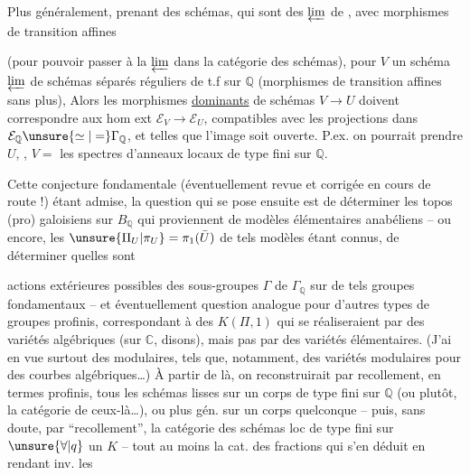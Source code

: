 Plus généralement, prenant  des schémas,  qui sont des $\varprojlim$ de   , avec morphismes de transition  affines

(pour pouvoir passer à la $\varprojlim$ dans la catégorie des schémas), pour $V$ un schéma $\varprojlim$ de schémas séparés réguliers de t.f sur $\mathbb{Q}$ (morphismes de transition  affines sans plus), Alors les morphismes \uline{dominants} de schémas $V\longrightarrow U$ doivent correspondre aux hom ext $\mathcal{E}_V\longrightarrow\mathcal{E}_U$, compatibles avec les projections dans $\mathcal{E}_{\mathbb{Q}}\unsure{\simeq|=}\Gamma_{\mathbb{Q}}$, et telles que l'image soit ouverte. P.ex. on pourrait prendre  $U$, , $V=$ les spectres d'anneaux locaux  de type fini sur $\mathbb{Q}$.


Cette conjecture fondamentale (éventuellement revue et corrigée en cours de route !) étant admise, la question qui se pose ensuite est de déterminer les topos (pro) galoisiens sur $B_{\mathbb{Q}}$ qui proviennent de modèles élémentaires anabéliens -- ou encore, les $\unsure{\Pi_U|\pi_U}=\pi_1(\bar U)$ de tels modèles étant connus, de déterminer quelles sont

actions extérieures possibles des sous-groupes $\Gamma$ de $\Gamma_{\mathbb{Q}}$ sur de tels groupes fondamentaux -- et éventuellement question analogue pour d'autres types de groupes profinis, correspondant à des $K(\Pi,1)$ qui se réaliseraient par des variétés algébriques (sur $\mathbb{C}$, disons), mais pas par des variétés élémentaires. (J'ai en vue surtout des   modulaires, tels que, notamment, des variétés modulaires pour des courbes algébriques\ldots) À partir de là, on reconstruirait par recollement, en termes profinis, tous les schémas lisses sur un corps de type fini sur $\mathbb{Q}$ (ou plutôt, la catégorie de ceux-là\ldots), ou plus gén. sur un corps quelconque -- puis, sans doute, par ``recollement'', la catégorie des schémas loc de type fini sur $\unsure{\forall|q}$ un $K$ -- tout au moins la cat. des fractions qui s'en déduit en  rendant inv. les

